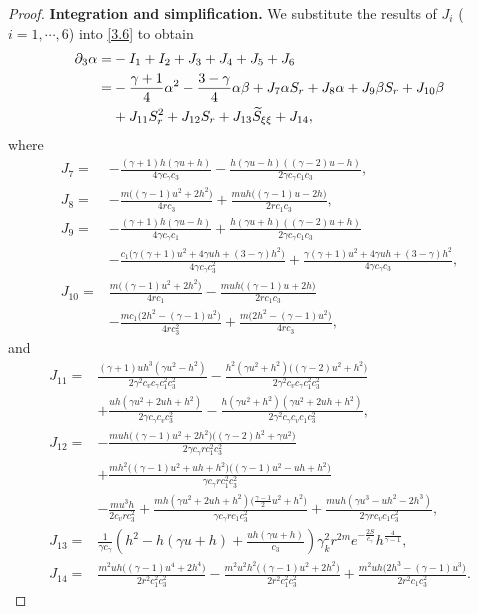 \documentclass[10pt,a4paper]{amsart}
\begin{document}
\begin{proof}
\noindent\textbf{Integration and simplification.} We substitute the results of $J_{i}$ ($i=1,\cdots,6$) into \eqref{3.6} to obtain
\begin{align}\label{3.7}
\partial_3 \alpha=&-I_1+I_2+J_3+J_{4}+J_{5}+J_{6}\notag\\
=&-\frac{\gamma+1}{4}\alpha^{2}
- \frac{3-\gamma}{4}\alpha\beta +J_7\alpha S_{r} +J_8\alpha +J_9\beta S_r +J_{10}\beta \notag \\
&+J_{11}S_{r}^2 +J_{12}S_r +J_{13}\widetilde{S}_{\xi\xi}  +J_{14},
\end{align}
where
\begin{align*}
J_7=&- \frac{(\gamma+1)h(\gamma u+h)}{4\gamma c_\gamma c_3}
   - \frac{h(\gamma u-h)((\gamma-2)u-h)}{2\gamma c_\gamma c_1 c_3}, \\
J_8=&- \frac{m\big((\gamma-1)u^2+2h^2\big)}{4r c_3}
   + \frac{muh\big((\gamma-1)u-2h\big)}{2r c_1 c_3}, \\
J_9=& -\frac{(\gamma+1)h(\gamma u-h)}{4\gamma c_\gamma c_1}
   + \frac{h(\gamma u+h)((\gamma-2)u+h)}{2\gamma c_\gamma c_1 c_3} \\
&- \frac{c_1\big(\gamma(\gamma+1)u^2+4\gamma uh+(3-\gamma)h^2\big)}{4\gamma c_\gamma c_3^2} + \frac{\gamma(\gamma+1)u^2+4\gamma uh+(3-\gamma)h^2}{4\gamma c_\gamma c_3}, \\
J_{10}=& \frac{m\big((\gamma-1)u^2+2h^2\big)}{4r c_1}
   - \frac{muh\big((\gamma-1)u+2h\big)}{2r c_1 c_3} \\
&- \frac{m c_1\big(2h^2-(\gamma-1)u^2\big)}{4r c_3^2} + \frac{m\big(2h^2-(\gamma-1)u^2\big)}{4r c_3},
\end{align*}
and
\begin{align*}
J_{11}=& \frac{(\gamma+1)uh^{3}(\gamma u^{2}-h^{2})}{2\gamma^{2} c_v c_\gamma c_1^{2} c_3^{2}}
   - \frac{h^{2}(\gamma u^{2}+h^{2})\big((\gamma-2)u^{2}+h^{2}\big)}{2\gamma^{2} c_v c_\gamma c_1^{2} c_3^{2}}  \\
&+ \frac{uh(\gamma u^{2}+2uh+h^{2})}{2\gamma c_\gamma c_v c_3^{2}}
   - \frac{h(\gamma u^{2}+h^{2})(\gamma u^{2}+2uh+h^{2})}{2\gamma^{2} c_\gamma c_v c_1 c_3^{2}}, \\
J_{12}=& -\frac{muh\big((\gamma-1)u^{2}+2h^{2}\big)\big((\gamma-2)h^{2}+\gamma u^{2}\big)}{2\gamma c_\gamma r c_1^{2} c_3^{2}} \\
&+ \frac{mh^{2}\big((\gamma-1)u^{2}+uh+h^{2}\big)\big((\gamma-1)u^{2}-uh+h^{2}\big)}{\gamma c_\gamma r c_1^{2} c_3^{2}}   \\
&- \frac{m u^{3} h}{2c_v r c_3^{2}}
   + \frac{mh(\gamma u^{2}+2uh+h^{2})\big(\frac{\gamma-1}{2}u^{2}+h^{2}\big)}{\gamma c_\gamma r c_1 c_3^{2}}
   + \frac{muh(\gamma u^{3}-uh^{2}-2h^{3})}{2\gamma r c_v c_1 c_3^{2}}, \\
J_{13}=& \frac{1}{\gamma c_{\gamma}}
\left( h^2 - h(\gamma u+h) + \frac{uh(\gamma u+h)}{c_3} \right)\gamma_k^2 r^{2m} e^{-\frac{2S}{c_\gamma}} h^{\frac{4}{\gamma-1}}, \\
J_{14}=&\frac{m^{2}uh\big((\gamma-1)u^{4}+2h^{4}\big)}{2r^{2} c_1^{2} c_3^{2}} - \frac{m^{2}u^{2}h^{2}\big((\gamma-1)u^{2}+2h^{2}\big)}{2r^{2} c_1^{2} c_3^{2}} + \frac{m^2u h\big(2h^{3}-(\gamma-1)u^{3}\big)}{2r^{2} c_1 c_3^{2}}.
\end{align*}


\end{proof}
\end{document}
